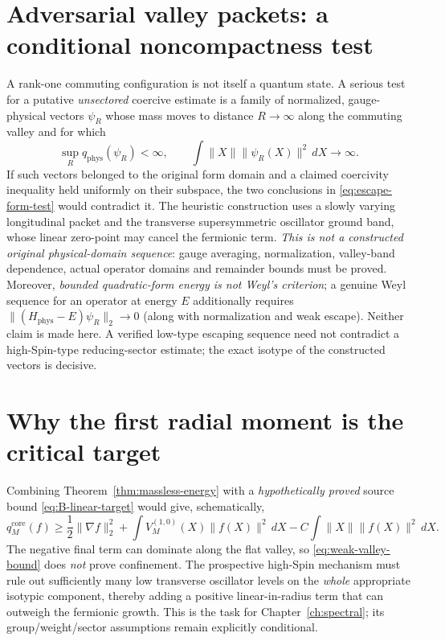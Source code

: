 \section{Adversarial valley packets: a conditional noncompactness test}
\label{sec:valley-packets}
A rank-one commuting configuration is not itself a quantum state. A
serious test for a putative \emph{unsectored} coercive estimate is a
family of normalized, gauge-physical vectors $\psi_R$ whose mass moves
to distance $R\to\infty$ along the commuting valley and for which
\begin{equation}\label{eq:escape-form-test}
  \sup_R q_{\mathrm{phys}}(\psi_R)<\infty,\qquad
  \int\|X\|\|\psi_R(X)\|^2\,dX\longrightarrow\infty.
\end{equation}
If such vectors belonged to the original form domain and a claimed
coercivity inequality held uniformly on their subspace, the two
conclusions in \eqref{eq:escape-form-test} would contradict it.
The heuristic construction uses a slowly varying longitudinal packet
and the transverse supersymmetric oscillator ground band, whose
linear zero-point may cancel the fermionic term. \emph{This is not a
constructed original physical-domain sequence}: gauge averaging,
normalization, valley-band dependence, actual operator domains and
remainder bounds must be proved. Moreover, \emph{bounded quadratic-form
energy is not Weyl's criterion}; a genuine Weyl sequence for an
operator at energy $E$ additionally requires
$\|(H_{\mathrm{phys}}-E)\psi_R\|_2\to0$ (along with
normalization and weak escape). Neither claim is made here.
A verified low-type escaping sequence need not contradict a
high-Spin-type reducing-sector estimate; the exact isotype of the
constructed vectors is decisive.

\section{Why the first radial moment is the critical target}
Combining Theorem~\ref{thm:massless-energy} with a \emph{hypothetically
proved} source bound \eqref{eq:B-linear-target} would give, schematically,
\begin{equation}\label{eq:weak-valley-bound}
 q_M^{\mathrm{core}}(f)\ge
 \frac12\|\nabla f\|_2^2 +\int V_M^{(1,0)}(X)\|f(X)\|^2\,dX
   -C\int\|X\|\|f(X)\|^2\,dX.
\end{equation}
The negative final term can dominate along the flat valley, so
\eqref{eq:weak-valley-bound} does \emph{not} prove confinement. The
prospective high-Spin mechanism must rule out sufficiently many low
transverse oscillator levels on the \emph{whole} appropriate isotypic
component, thereby adding a positive linear-in-radius term that can
outweigh the fermionic growth. This is the task for
Chapter~\ref{ch:spectral}; its group/weight/sector assumptions remain
explicitly conditional.

